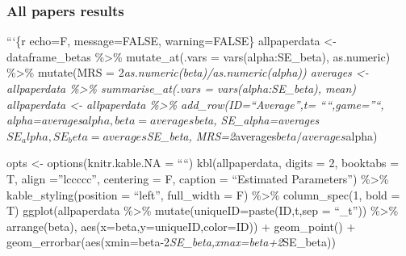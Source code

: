 \hypertarget{all-papers-results}{%
\subsubsection{All papers results}\label{all-papers-results}}

```\{r echo=F, message=FALSE, warning=FALSE\} allpaperdata \textless-
dataframe\_betas \%\textgreater\% mutate\_at(.vars =
vars(alpha:SE\_beta), as.numeric) \%\textgreater\% mutate(MRS =
2\emph{as.numeric(beta)/as.numeric(alpha)) averages \textless-
allpaperdata \%\textgreater\% summarise\_at(.vars =
vars(alpha:SE\_beta), mean) allpaperdata \textless- allpaperdata
\%\textgreater\% add\_row(ID=``Average'',t= ````,game=''``,
alpha=averages\(alpha, beta=averages\)beta,
SE\_alpha=averages\(SE_alpha, SE_beta=averages\)SE\_beta,
MRS=2}averages\(beta/averages\)alpha)

opts \textless- options(knitr.kable.NA = ````) kbl(allpaperdata, digits
= 2, booktabs = T, align =''lccccc'', centering = F, caption =
``Estimated Parameters'') \%\textgreater\% kable\_styling(position =
``left'', full\_width = F) \%\textgreater\% column\_spec(1, bold = T)
ggplot(allpaperdata \%\textgreater\% mutate(uniqueID=paste(ID,t,sep =
``\_t'')) \%\textgreater\% arrange(beta),
aes(x=beta,y=uniqueID,color=ID)) + geom\_point() +
geom\_errorbar(aes(xmin=beta-2\emph{SE\_beta,xmax=beta+2}SE\_beta))

